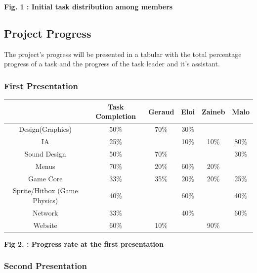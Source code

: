 \documentclass[a4paper, 11pt] {article}
\begin{document}
\begin{center}
    \bf{Fig. 1 : Initial task distribution among members}
\end{center}

\newpage
\subsection{Project Progress}

\par
The project's progress will be presented in a tabular with the total percentage progress of a task
and the progress of the task leader and it's assistant.
\newline

\subsubsection{First Presentation}

\begin{center}
\begin{tabular}{|c|c|c|c|c|c|}
    \hline & Task Completion & Geraud & Eloi & Zaineb & Malo  \\
    \hline Design(Graphics) & 50\% & 70\% & 30\% & &  \\
    \hline IA & 25\% &  & 10\% & 10\% & 80\%   \\
    \hline Sound Design & 50\% & 70\% & & & 30\% \\
    \hline Menus & 70\%  & 20\% & 60\%  & 20\% & \\
    \hline Game Core & 33\%  & 35\% & 20\% & 20\% & 25\% \\
    \hline Sprite/Hitbox (Game Physics) & 40\% & & 60\% & & 40\% \\
    \hline Network & 33\% & & 40\% & & 60\% \\
    \hline Website & 60\% & 10\%  &  & 90\% &  \\
    \hline
\end{tabular}
\end{center}

\begin{center}
    \bf{Fig 2. : Progress rate at the first presentation}
\end{center}

\subsubsection{Second Presentation}
\end{document}
